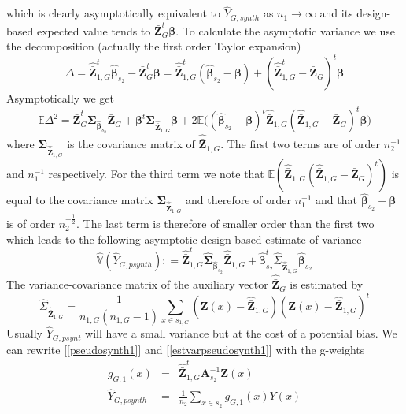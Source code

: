 \documentclass[a4paper,12pt,leqno, titlepage]{article}
\newcommand{\EX}{\mathbb{E}}
\newcommand{\VAR}{\mathbb{V}}
\begin{document}
which is clearly asymptotically equivalent to $\hat{Y}_{G,synth}$ as $n_1 \to \infty$ and its design-based expected value tends to  $\bar{\pmb{Z}}^t_G\pmb{\beta}$. To calculate the asymptotic variance we use the decomposition (actually the first order Taylor expansion)
$$\Delta=\hat{\bar{\pmb{Z}}}_{1,G}^t\hat{\pmb{\beta}}_{s_2}-\bar{\pmb{Z}}_G^t\pmb{\beta}=
\hat{\bar{\pmb{Z}}}_{1,G}^t(\hat{\pmb{\beta}}_{s_2}-\pmb{\beta})+ (\hat{\bar{\pmb{Z}}}_{1,G}^t-\bar{\pmb{Z}}_G)^t\pmb{\beta}$$
Asymptotically we get
$$\EX \Delta^2=\bar{\pmb{Z}}_G ^t\pmb{\Sigma}_{\hat{\pmb{\beta}}_{s_2}}\bar{\pmb{Z}}_G+
\pmb{\beta}^t\pmb{\Sigma}_{\hat{\bar{\pmb{Z}}}_{1,G}}\pmb{\beta}+
2\EX\Big((\hat{\pmb{\beta}}_{s_2}-\pmb{\beta})^t\hat{\bar{\pmb{Z}}}_{1,G}(\hat{\bar{\pmb{Z}}}_{1,G}
-\bar{\pmb{Z}}_G)^t\pmb{\beta}\Big)$$
\noindent where $\pmb{\Sigma}_{\hat{\bar{\pmb{Z}}}_{1,G}}$ is the covariance matrix of
$\hat{\bar{\pmb{Z}}}_{1,G}  $. The first two terms are of order $n_2^{-1}$ and $n_1^{-1}$ respectively. For the third term we note that
$\EX (\hat{\bar{\pmb{Z}}}_{1,G}(\hat{\bar{\pmb{Z}}}_{1,G}-\bar{\pmb{Z}}_G)^t)$ is equal to the covariance matrix $\pmb{\Sigma}_{\hat{\bar{\pmb{Z}}}_{1,G}}$ and therefore of order $n_1^{-1}$ and that
$\hat{\pmb{\beta}}_{s_2}-\pmb{\beta}$ is of order $n_2^{-\frac{1}{2}}$. The last term is therefore of smaller order than the first two which leads to the following asymptotic design-based estimate of variance
\begin{equation}\label{estvarpseudosynth1}
\hat{\VAR}(\hat{Y}_{G,psynth}): =
\hat{\bar{\pmb{Z}}}_{1,G}^t\hat{\pmb{\Sigma}}_{\hat{\pmb{\beta}}_{s_2}}\hat{\bar{\pmb{Z}}}_{1,G}
+ \hat{\pmb{\beta}}_{s_2}^t\hat{\Sigma}_{\hat{\bar{\pmb{Z}}}_{1,G}}\hat{\pmb{\beta}}_{s_2}
\end{equation}
The variance-covariance matrix of the auxiliary vector $\hat{\bar{\pmb{Z}}}_G$ is estimated by
\begin{equation}\label{estvarcovaux}
\hat{\Sigma}_{\hat{\bar{\pmb{Z}}}_{1,G}}=
\frac{1}{n_{1,G}(n_{1,G}-1)}\sum_{x\in{s_{1,G}}}
(\pmb{Z}(x)-\hat{\bar{\pmb{Z}}}_{1,G})(\pmb{Z}(x)-\hat{\bar{\pmb{Z}}}_{1,G})^t
\end{equation}
Usually $\hat{Y}_{G,psynt}$ will have a small variance but at the cost of a potential bias.
We can rewrite [\ref{pseudosynth1}] and [\ref{estvarpseudosynth1}] with the g-weights
\begin{eqnarray}\label{gweightpseudo}
g_{G,1}(x)&=&\hat{\bar{\pmb{Z}}}^t_{1,G}\pmb{A}^{-1}_{s_2}\pmb{Z}(x) \nonumber\\
\hat{Y}_{G,psynth}&=&\frac{1}{n_2}\sum_{x\in{s_2}}g_{G,1}(x)Y(x)
\end{eqnarray}
\end{document}
